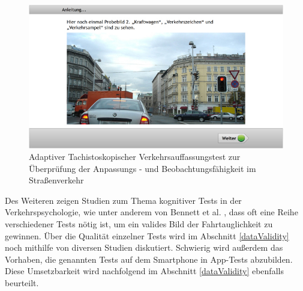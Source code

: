 \begin{figure}[H]
\centering
\includegraphics[width=\linewidth]{images/atavt}
\caption[Caption for parameters]{Adaptiver Tachistoskopischer Verkehrsauffassungstest zur Überprüfung der Anpassungs - und Beobachtungsfähigkeit im Straßenverkehr \footnotemark}
\label{fig:atavt}
\end{figure}

Des Weiteren zeigen Studien zum Thema kognitiver Tests in der Verkehrspsychologie, wie unter anderem von Bennett et al. \cite{cognitivetestsfitnesstodrive}, dass oft eine Reihe verschiedener Tests nötig ist, um ein valides Bild der Fahrtauglichkeit zu gewinnen. Über die Qualität einzelner Tests wird im Abschnitt \ref{dataValidity} noch mithilfe von diversen Studien diskutiert. Schwierig wird außerdem das Vorhaben, die genannten Tests auf dem Smartphone in App-Tests abzubilden. Diese Umsetzbarkeit wird nachfolgend im Abschnitt \ref{dataValidity} ebenfalls beurteilt.

